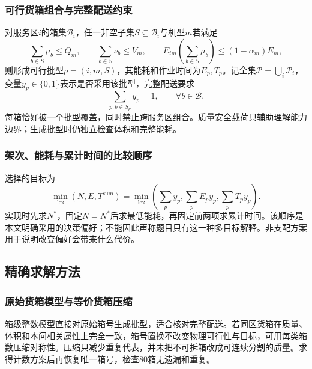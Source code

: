 \subsubsection{可行货箱组合与完整配送约束}
对服务区$i$的箱集$\mathcal B_i$，任一非空子集$S\subseteq\mathcal B_i$与机型$m$若满足
\begin{equation}
 \sum_{b\in S}\mu_b\le Q_m,\qquad
 \sum_{b\in S}\nu_b\le V_m,\qquad
 E_{im}\!\left(\sum_{b\in S}\mu_b\right)\le(1-\alpha_m)E_m,
\label{eq:q1_pattern_feasibility}
\end{equation}
则形成可行批型$p=(i,m,S)$，其能耗和作业时间为$E_p,T_p$。记全集$\mathcal P=\bigcup_i\mathcal P_i$，变量$y_p\in\{0,1\}$表示是否采用该批型，完整配送要求
\begin{equation}
 \sum_{p:b\in S_p}y_p=1,\qquad \forall b\in\mathcal B.
\label{eq:q1_cover}
\end{equation}
每箱恰好被一个批型覆盖，同时禁止跨服务区组合。质量安全载荷只辅助理解能力边界；生成批型时仍独立检查体积和完整能耗。

\subsubsection{架次、能耗与累计时间的比较顺序}
选择的目标为
\begin{equation}
 \min_{\mathrm{lex}}\left(N,E,T^{\mathrm{sum}}\right)
 =\min_{\mathrm{lex}}\left(\sum_py_p,\sum_pE_py_p,\sum_pT_py_p\right).
\label{eq:q1_objective}
\end{equation}
实现时先求$N^*$，固定$N=N^*$后求最低能耗，再固定前两项求累计时间。该顺序是本文明确采用的决策偏好；不能因此声称题目只有这一种多目标解释。非支配方案用于说明改变偏好会带来什么代价。



\subsection{精确求解方法}
\subsubsection{原始货箱模型与等价货箱压缩}
箱级整数模型直接对原始箱号生成批型，适合核对完整配送。若同区货箱在质量、体积和本问相关属性上完全一致，箱号置换不改变物理可行性与目标，可用每类箱数压缩对称性。压缩只减少重复代表，并未把不可拆箱改成可连续分割的质量。求得计数方案后再恢复唯一箱号，检查80箱无遗漏和重复。

